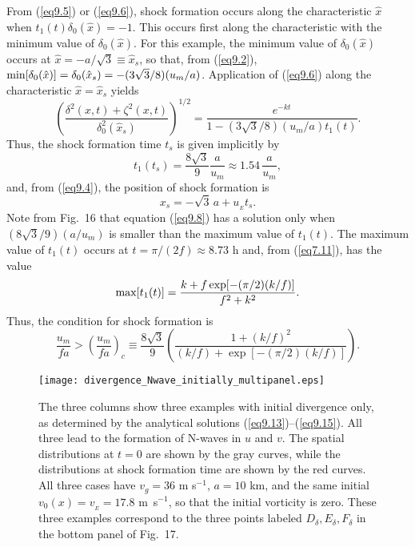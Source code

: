 \documentclass[10pt]{article}
\begin{document}
From (\ref{eq9.5}) or (\ref{eq9.6}), shock formation occurs along the characteristic
$\hat{x}$ when $t_1(t)\delta_0(\hat{x}) = -1$. This occurs first along the characteristic
with the minimum value of $\delta_0(\hat{x})$. For this example, the minimum value of
$\delta_0(\hat{x})$ occurs at $\hat{x}=-a/\sqrt{3}\equiv\hat{x}_s$, so that, from (\ref{eq9.2}),
${\rm min}[\delta_0(\hat{x})]=\delta_0(\hat{x}_s)=-(3\sqrt{3}/8)(u_m/a)$. Application
of (\ref{eq9.6}) along the characteristic $\hat{x}=\hat{x}_s$ yields
\begin{equation}                                    %
        \left(\frac{\delta^2(x,t) + \zeta^2(x,t)}{\delta_0^2(\hat{x}_s)}\right)^{1/2}
     = \frac{e^{-kt}}{1 - (3\sqrt{3}/8)(u_m/a)t_1(t)}.
\label{eq9.7}
\end{equation}
Thus, the shock formation time $t_s$ is given implicitly by
\begin{equation}                                  %
         t_1(t_s) = \frac{8\sqrt{3}}{9}\frac{a}{u_m} \approx 1.54\,\frac{a}{u_m},
\label{eq9.8}
\end{equation}
and, from (\ref{eq9.4}), the position of shock formation is
\begin{equation}                                  %
             x_s = -\sqrt{3}\, a + u_{_E} t_s.
\label{eq9.9}
\end{equation}
Note from Fig.~16 that equation (\ref{eq9.8}) has a solution only when $(8\sqrt{3}/9)(a/u_m)$
is smaller than the maximum value of $t_1(t)$. The maximum value of $t_1(t)$
occurs at $t=\pi/(2f) \approx 8.73$ h and, from (\ref{eq7.11}), has the value
   $$  {\rm max}[t_1(t)] = \frac{k+f\exp[-(\pi/2)(k/f)]}{f^2+k^2}.  $$
Thus, the condition for shock formation is
\begin{equation}                                  %
         \frac{u_m}{fa} > \left(\frac{u_m}{fa}\right)_c
       \equiv \frac{8\sqrt{3}}{9}\left(\frac{1 + (k/f)^2}{(k/f) + \exp[-(\pi/2)(k/f)]}\right).
\label{eq9.10}
\end{equation}


\begin{figure*}[!t]                    %
\centerline{\texttt{[image: divergence\_Nwave\_initially\_multipanel.eps]}}
\caption{The three columns show three examples with initial divergence only,
as determined by the analytical solutions (\ref{eq9.13})--(\ref{eq9.15}). All three
lead to the formation of N-waves in $u$ and $v$. The
spatial distributions at $t=0$ are shown by the gray curves, while the distributions
at shock formation time are shown by the red curves. All three cases have
$v_g=36$ m s$^{-1}$, $a=10$ km, and the same initial $v_0(x)=v_{_E}=17.8$ m~s$^{-1}$,
so that the initial vorticity is zero. These three examples correspond to the three
points labeled $D_\delta,E_\delta,F_\delta$ in the bottom panel of Fig.~17.}
\end{figure*}
\end{document}

